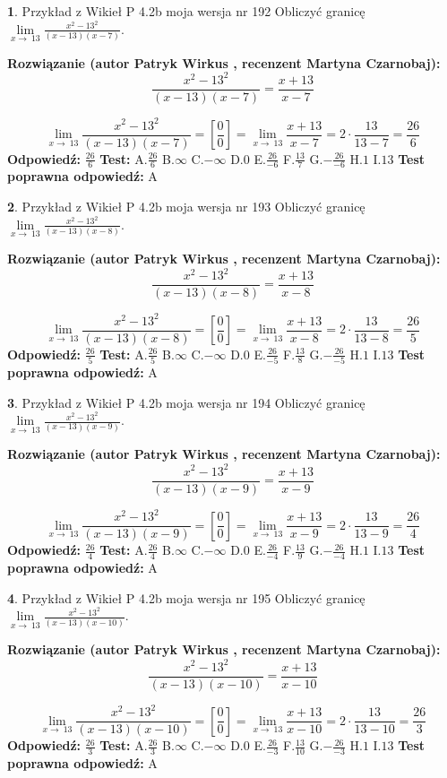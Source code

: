 \documentclass[12pt, a4paper]{article}
\theoremstyle{definition} %
\newtheorem{zad}{}
\newcommand{\zadStart}[1]{\begin{zad}#1\newline}
\newcommand{\zadStop}{\end{zad}}
\newcommand{\rozwStart}[2]{\noindent \textbf{Rozwiązanie (autor #1 , recenzent #2): }\newline}
\newcommand{\rozwStop}{\newline}
\newcommand{\odpStart}{\noindent \textbf{Odpowiedź:}\newline}
\newcommand{\odpStop}{\newline}
\newcommand{\testStart}{\noindent \textbf{Test:}\newline}
\newcommand{\testStop}{\newline}
\newcommand{\kluczStart}{\noindent \textbf{Test poprawna odpowiedź:}\newline}
\newcommand{\kluczStop}{\newline}
\begin{document}
\zadStart{Przykład z Wikieł P 4.2b moja wersja nr 192}
Obliczyć granicę $\lim\limits_{x\to\ 13}\frac{x^{2}-13^{2}}{(x-13)(x-7)}$.
\zadStop
\rozwStart{Patryk Wirkus}{Martyna Czarnobaj}
$$\frac{x^{2}-13^{2}}{(x-13)(x-7)}=\frac{x+13}{x-7}$$

$$\lim\limits_{x\to\ 13}\frac{x^{2}-13^{2}}{(x-13)(x-7)}=[\frac{0}{0}]=\lim\limits_{x\to\ 13}\frac{x+13}{x-7}=2 \cdot \frac{13}{13-7} = \frac{26}{6}$$
\rozwStop
\odpStart
$\frac{26}{6}$
\odpStop
\testStart
A.$\frac{26}{6}$
B.$\infty$
C.$-\infty$
D.$0$
E.$\frac{26}{-6}$
F.$\frac{13}{7}$
G.$-\frac{26}{-6}$
H.$1$
I.$13$
\testStop
\kluczStart
A
\kluczStop



\zadStart{Przykład z Wikieł P 4.2b moja wersja nr 193}
Obliczyć granicę $\lim\limits_{x\to\ 13}\frac{x^{2}-13^{2}}{(x-13)(x-8)}$.
\zadStop
\rozwStart{Patryk Wirkus}{Martyna Czarnobaj}
$$\frac{x^{2}-13^{2}}{(x-13)(x-8)}=\frac{x+13}{x-8}$$

$$\lim\limits_{x\to\ 13}\frac{x^{2}-13^{2}}{(x-13)(x-8)}=[\frac{0}{0}]=\lim\limits_{x\to\ 13}\frac{x+13}{x-8}=2 \cdot \frac{13}{13-8} = \frac{26}{5}$$
\rozwStop
\odpStart
$\frac{26}{5}$
\odpStop
\testStart
A.$\frac{26}{5}$
B.$\infty$
C.$-\infty$
D.$0$
E.$\frac{26}{-5}$
F.$\frac{13}{8}$
G.$-\frac{26}{-5}$
H.$1$
I.$13$
\testStop
\kluczStart
A
\kluczStop



\zadStart{Przykład z Wikieł P 4.2b moja wersja nr 194}
Obliczyć granicę $\lim\limits_{x\to\ 13}\frac{x^{2}-13^{2}}{(x-13)(x-9)}$.
\zadStop
\rozwStart{Patryk Wirkus}{Martyna Czarnobaj}
$$\frac{x^{2}-13^{2}}{(x-13)(x-9)}=\frac{x+13}{x-9}$$

$$\lim\limits_{x\to\ 13}\frac{x^{2}-13^{2}}{(x-13)(x-9)}=[\frac{0}{0}]=\lim\limits_{x\to\ 13}\frac{x+13}{x-9}=2 \cdot \frac{13}{13-9} = \frac{26}{4}$$
\rozwStop
\odpStart
$\frac{26}{4}$
\odpStop
\testStart
A.$\frac{26}{4}$
B.$\infty$
C.$-\infty$
D.$0$
E.$\frac{26}{-4}$
F.$\frac{13}{9}$
G.$-\frac{26}{-4}$
H.$1$
I.$13$
\testStop
\kluczStart
A
\kluczStop



\zadStart{Przykład z Wikieł P 4.2b moja wersja nr 195}
Obliczyć granicę $\lim\limits_{x\to\ 13}\frac{x^{2}-13^{2}}{(x-13)(x-10)}$.
\zadStop
\rozwStart{Patryk Wirkus}{Martyna Czarnobaj}
$$\frac{x^{2}-13^{2}}{(x-13)(x-10)}=\frac{x+13}{x-10}$$

$$\lim\limits_{x\to\ 13}\frac{x^{2}-13^{2}}{(x-13)(x-10)}=[\frac{0}{0}]=\lim\limits_{x\to\ 13}\frac{x+13}{x-10}=2 \cdot \frac{13}{13-10} = \frac{26}{3}$$
\rozwStop
\odpStart
$\frac{26}{3}$
\odpStop
\testStart
A.$\frac{26}{3}$
B.$\infty$
C.$-\infty$
D.$0$
E.$\frac{26}{-3}$
F.$\frac{13}{10}$
G.$-\frac{26}{-3}$
H.$1$
I.$13$
\testStop
\kluczStart
A
\kluczStop
\end{document}
